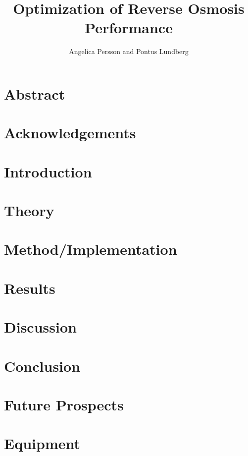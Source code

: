 \documentclass{LTHthesis}
\begin{document}
\begin{titlepages}
\author{Angelica Persson and Pontus Lundberg}
\title{Optimization of Reverse Osmosis Performance}
\end{titlepages}
\chapter{Abstract}

\chapter{Acknowledgements}


\tableofcontents




\chapter{Introduction}


\chapter{Theory}


%

\chapter{Method/Implementation}


\chapter{Results}


\chapter{Discussion}


\chapter{Conclusion}


\chapter{Future Prospects}


\printbibliography 
\clearpage
\appendix
\chapter{Equipment} 
\label{A}

\end{document}
